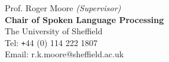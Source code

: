 \documentclass[10pt]{article} %
\begin{document}
\begin{changemargin}{0pt}{0.5pt}
\begin{minipage}[t]{0.44\textwidth}
\begin{changemargin}{5pt}{5pt}
	
\vspace{5pt}

Prof. Roger Moore \textit{(Supervisor)}\\
\textbf{Chair of Spoken Language Processing}\\
The University of Sheffield\\
Tel: \texttt{+}44 (0) 114 222 1807\\
Email: r.k.moore@sheffield.ac.uk\\

\end{changemargin}


	
	


\end{minipage} %

\end{changemargin}
\end{document}
